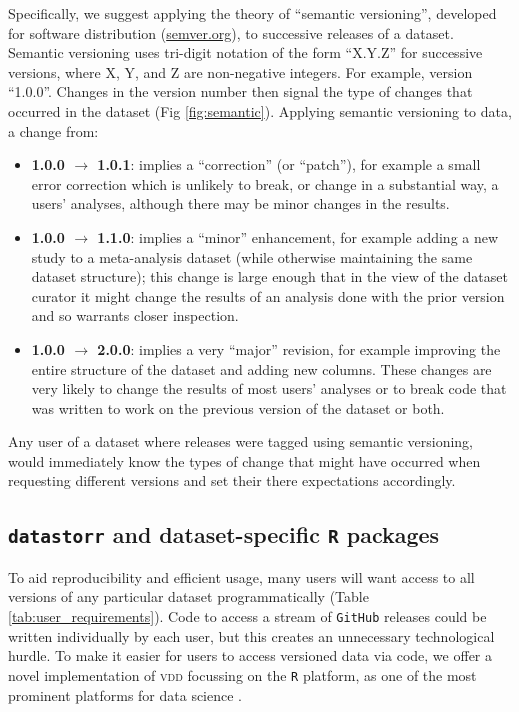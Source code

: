 \documentclass[english]{article}
\begin{document}
Specifically, we suggest applying the theory of ``semantic versioning'', developed for software distribution (\href{http://semver.org/}{semver.org}), to successive releases of a dataset. Semantic versioning uses tri-digit notation of the form ``X.Y.Z'' for successive versions, where X, Y, and Z are non-negative integers. For example, version ``1.0.0''. Changes in the version number then signal the type of changes that occurred in the dataset (Fig \ref{fig:semantic}). Applying semantic versioning to data, a change from:
\begin{itemize}
  \item {\bf 1.0.0 $\rightarrow$ 1.0.1}: implies a ``correction'' (or ``patch''), for example a small error correction which is unlikely to break, or change in a substantial way, a users' analyses, although there may be minor changes in the results.
  \item {\bf 1.0.0 $\rightarrow$ 1.1.0}: implies a ``minor'' enhancement, for example adding a new study to a meta-analysis dataset (while otherwise maintaining the same dataset structure); this change is large enough that in the view of the dataset curator it might change the results of an analysis done with the prior version and so warrants closer inspection.
  \item {\bf 1.0.0 $\rightarrow$ 2.0.0}: implies a very ``major'' revision, for example improving the entire structure of the dataset and adding new columns. These changes are very likely to change the results of most users' analyses or to break code that was written to work on the previous version of the dataset or both.
\end{itemize}
Any user of a dataset where releases were tagged using semantic versioning, would immediately know the types of change that might have occurred when requesting different versions and set their there expectations accordingly.


\subsection*{\texttt{datastorr} and dataset-specific \texttt{R} packages}

To aid reproducibility and efficient usage, many users will want access to all versions of any particular dataset programmatically (Table \ref{tab:user_requirements}). Code to access a stream of \texttt{GitHub} releases could be written individually by each user, but this creates an unnecessary technological hurdle. To make it easier for users to access versioned data via code, we offer a novel implementation of \textsc{vdd} focussing on the \texttt{R} platform, as one of the most prominent platforms for data science \cite{R-2017}.
\end{document}
